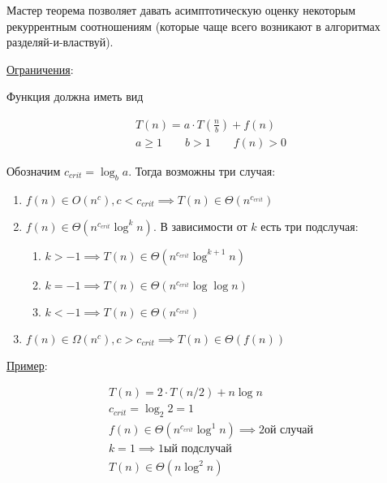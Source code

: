 
Мастер теорема позволяет давать асимптотическую оценку некоторым рекуррентным
соотношениям (которые чаще всего возникают в алгоритмах разделяй-и-властвуй).

\underline{Ограничения}:

Функция должна иметь вид

\begin{align*}
  T(n) = a \cdot T \left( \frac{n}{b} \right) + f(n) \\
  a \ge 1 \qquad b > 1 \qquad f(n) > 0
\end{align*}

Обозначим \(c_{crit} = \log_{b} a\). Тогда возможны три случая:

\begin{enumerate}
  \item \(
    f(n) \in O(n^{c}), c < c_{crit}
    \implies T(n) \in \Theta(n^{c_{crit}})
  \)

  \item \(f(n) \in \Theta(n^{c_{crit}} \log^{k} n)\). В зависимости от \(k\)
  есть три подслучая:

  \begin{enumerate}
    \item \(k > -1 \implies T(n) \in \Theta(n^{c_{crit}} \log^{k + 1} n)\)
    \item \(k = -1 \implies T(n) \in \Theta(n^{c_{crit}} \log \log n)\)
    \item \(k < -1 \implies T(n) \in \Theta(n^{c_{crit}})\)
  \end{enumerate}

  \item \(
    f(n) \in \Omega(n^{c}), c > c_{crit}
    \implies T(n) \in \Theta(f(n))
  \)
\end{enumerate}

\underline{Пример}:

\begin{align*}
  T(n) = 2 \cdot T(n / 2) + n \log n \\
  c_{crit} = \log_{2} 2 = 1 \\
  f(n) \in \Theta(n^{c_{crit}} \log^{1} n) \implies \text{2ой случай} \\
  k = 1 \implies \text{1ый подслучай} \\
  T(n) \in \Theta(n \log^{2} n)
\end{align*}
